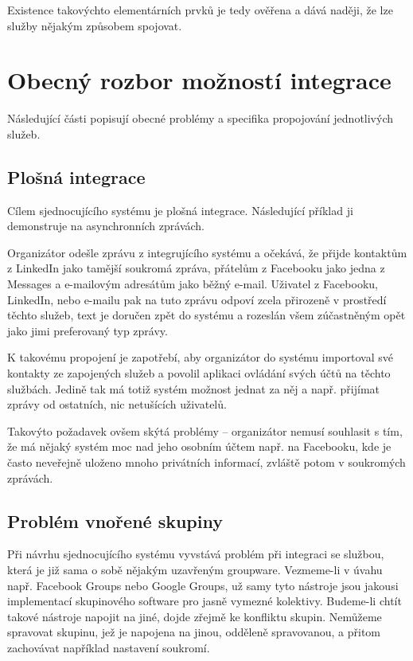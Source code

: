 \documentclass[12pt,oneside,final]{fithesis2}
\begin{document}
Existence takovýchto elementárních prvků je tedy ověřena a dává naději, že lze služby nějakým způsobem spojovat.


\section{Obecný rozbor možností integrace}
Následující části popisují obecné problémy a specifika propojování jednotlivých služeb.

\subsection{Plošná integrace}
Cílem sjednocujícího systému je plošná integrace. Následující příklad ji demonstruje na asynchronních zprávách.

Organizátor odešle zprávu z integrujícího systému a očekává, že přijde kontaktům z LinkedIn jako tamější soukromá zpráva, přátelům z Facebooku jako jedna z Messages a e-mailovým adresátům jako běžný e-mail. Uživatel z Facebooku, LinkedIn, nebo e-mailu pak na tuto zprávu odpoví zcela přirozeně v prostředí těchto služeb, text je doručen zpět do systému a rozeslán všem zúčastněným opět jako jimi preferovaný typ zprávy.

K takovému propojení je zapotřebí, aby organizátor do systému importoval své kontakty ze zapojených služeb a povolil aplikaci ovládání svých účtů na těchto službách. Jedině tak má totiž systém možnost jednat za něj a např. přijímat zprávy od ostatních, nic netušících uživatelů.

Takovýto požadavek ovšem skýtá problémy -- organizátor nemusí souhlasit s tím, že má nějaký systém moc nad jeho osobním účtem např. na Facebooku, kde je často neveřejně uloženo mnoho privátních informací, zvláště potom v soukromých zprávách.

\subsection{Problém vnořené skupiny}
Při návrhu sjednocujícího systému vyvstává problém při integraci se službou, která je již sama o sobě nějakým uzavřeným groupware. Vezmeme-li v úvahu např. Facebook Groups nebo Google Groups, už samy tyto nástroje jsou jakousi implementací skupinového software pro jasně vymezné kolektivy. Budeme-li chtít takové nástroje napojit na jiné, dojde zřejmě ke konfliktu skupin. Nemůžeme spravovat skupinu, jež je napojena na jinou, odděleně spravovanou, a přitom zachovávat například nastavení soukromí.
\end{document}
